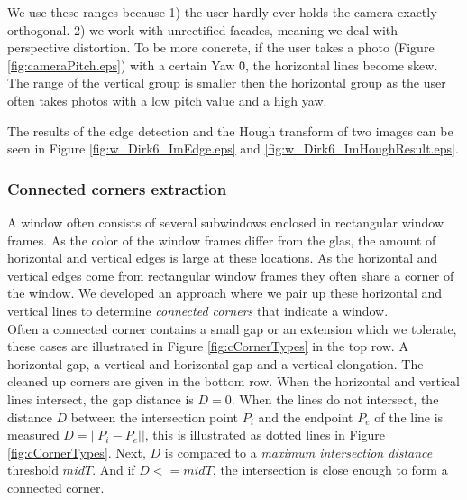 We use these ranges because 1) the user hardly ever holds the camera exactly
orthogonal.  2) we work with unrectified facades, meaning we deal with
perspective distortion.  To be more concrete, if the user takes a photo (Figure
\ref{fig:cameraPitch.eps}) with a certain Yaw \= 0, the horizontal lines become
skew.  The range of the vertical group is smaller then the horizontal group as
the user often takes photos with a low pitch value and a high yaw.

The results of the edge detection and the Hough transform of two images can be seen in Figure \ref{fig:w_Dirk6_ImEdge.eps} and
 \ref{fig:w_Dirk6_ImHoughResult.eps}.


\subsubsection{Connected corners extraction}
A window often consists of several subwindows enclosed in rectangular window
frames.  As the color of the window frames differ from the glas, the amount of
horizontal and vertical edges is large at these locations.  As the
horizontal and vertical edges come from rectangular window frames they often
share a corner of the window.  We developed an approach where we pair up these
horizontal and vertical lines to determine \emph{connected corners} that
indicate a window.\\

Often a connected corner contains a small gap or an extension which we tolerate,
these cases are illustrated in Figure \ref{fig:cCornerTypes} in the top row.
A horizontal gap, a vertical and horizontal gap and a vertical elongation. The
cleaned up corners are given in the bottom row.  When the horizontal and
vertical lines intersect, the gap distance is $D=0$.  When the lines do not
intersect, the distance $D$ between the intersection point $P_i$ and the endpoint $P_e$ of the
line is measured $D = ||P_i-P_e||$, this is illustrated as dotted lines in Figure
\ref{fig:cCornerTypes}.  Next, $D$ is compared to a \emph{maximum intersection
distance} threshold $midT$.  And if $D<=midT$, the intersection is close enough
to form a connected corner.\\


